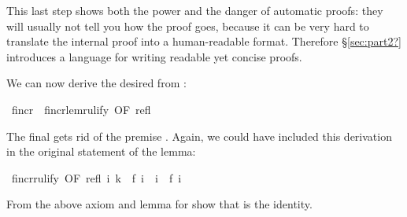 \begin{isabellebody}
\begin{isamarkuptext}
This last step shows both the power and the danger of automatic proofs: they
will usually not tell you how the proof goes, because it can be very hard to
translate the internal proof into a human-readable format. Therefore
\S\ref{sec:part2?} introduces a language for writing readable yet concise
proofs.

We can now derive the desired  from :%
\end{isamarkuptext}%
\ f{\isacharunderscore}incr\ {\isacharequal}\ f{\isacharunderscore}incr{\isacharunderscore}lem{\isacharbrackleft}rulify{\isacharcomma}\ OF\ refl{\isacharbrackright}%
\begin{isamarkuptext}%
\noindent
The final  gets rid of the premise . Again, we could
have included this derivation in the original statement of the lemma:%
\end{isamarkuptext}%
\ f{\isacharunderscore}incr{\isacharbrackleft}rulify{\isacharcomma}\ OF\ refl{\isacharbrackright}{\isacharcolon}\ {\isachardoublequote}{\isasymforall}i{\isachardot}\ k\ {\isacharequal}\ f\ i\ {\isasymlongrightarrow}\ i\ {\isasymle}\ f\ i{\isachardoublequote}%
\begin{isamarkuptext}%
\begin{exercise}
From the above axiom and lemma for  show that  is the identity.
\end{exercise}


\end{isamarkuptext}
\end{isabellebody}
